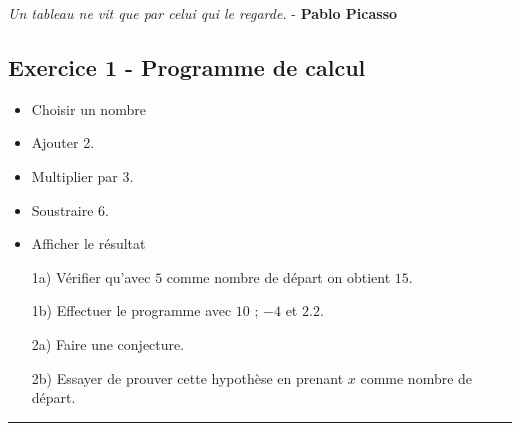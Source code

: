 \documentclass[12pt]{article}
\newcommand{\horrule}[1]{\rule{\linewidth}{#1}} %
\begin{document}

\begin{center}
  \textit{Un tableau ne vit que par celui qui le regarde.} - \textbf{Pablo Picasso}
\end{center}

\setlength{\columnseprule}{1pt}

\begin{multicols}{2}

  \subsection*{Exercice 1 - Programme de calcul}

  \begin{itemize}
  \item Choisir un nombre
  \item Ajouter 2.
  \item Multiplier par 3.
  \item Soustraire 6.
  \item Afficher le résultat
  \end{itemize}

  \begin{enumerate}
  \item[1a)] Vérifier qu'avec $5$ comme nombre de départ on obtient $15$.
  \item[1b)] Effectuer le programme avec $10$ ; $-4$ et $2.2$.
  \item[2a)] Faire une conjecture.
  \item[2b)] Essayer de prouver cette hypothèse en prenant $x$ comme nombre de départ.
  \end{enumerate}

\end{multicols}

\horrule{1px}
\end{document}

